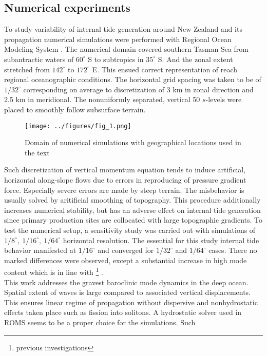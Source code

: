 \documentclass[12pt]{article}
\begin{document}
\subsection{Numerical experiments}
To study variability of internal tide generation around New Zealand and its propagation numerical 
simulations were performed with Regional Ocean Modeling System \citep{shchepetkin2005regional}. 
The numerical domain covered southern Tasman Sea from subantractic waters of $60^{\circ}$ S 
to subtropics in $35^{\circ}$ S. And the zonal extent stretched from $142^{\circ}$ to $172^{\circ}$ 
E. This ensued correct representation of reach regional oceanographic conditions. The horizontal 
grid spacing was taken to be of $1/32^{\circ}$ corresponding on average to discretization of 3 km 
in zonal direction and 2.5 km in meridional. The nonuniformly separated, vertical 50 $s$-levels 
were placed to smoothly follow subsurface terrain.\\
\begin{figure}
	\centering
	\texttt{[image: ../figures/fig\_1.png]}
	\caption{Domain of numerical simulations with geographical locations used in the text}
	\label{C3:fig:geo.map}
\end{figure}
Such discretization of vertical momentum equation tends to induce artificial, horizontal  
along-slope flows \citep{haidvogel1999numerical} due to errors in reproducing of pressure 
gradient force. Especially severe errors are made by steep terrain. The misbehavior is usually 
solved by aritificial smoothing of topography. This procedure additionally increases numerical 
stability, but has an adverse effect on internal tide generation \citep{di2006numerical} since 
primary production sites are collocated with large topographic gradients. To test the numerical 
setup, a sensitivity study was carried out with simulations of 
$1/8^{\circ},~1/16^{\circ},~1/64^{\circ}$ horizontal resolution. The essential for this study 
internal tide behavior manifested at $1/16^{\circ}$ and converged for $1/32^{\circ}$ and 
$1/64^{\circ}$ cases. There no marked differences were observed, except a substantial increase in 
high mode content which is in line with \footnote{previous investigations} 
\citep{di2006numerical}.\\
This work addresses the gravest baroclinic mode dynamics in the deep ocean. Spatial extent of 
waves is large compared to associated vertical displacements. This ensures linear regime of 
propagation without dispersive and nonhydrostatic effects taken place such as fission into 
solitons. A hydrostatic solver used in ROMS seems to be a proper choice for the simulations. Such 
\end{document}
